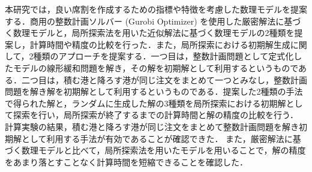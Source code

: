 本研究では，良い席割を作成するための指標や特徴を考慮した数理モデルを提案する．商用の整数計画ソルバー (Gurobi Optimizer) を使用した厳密解法に基づく数理モデルと，局所探索法を用いた近似解法に基づく数理モデルの2種類を提案し，計算時間や精度の比較を行った．また，局所探索における初期解生成に関して，2種類のアプローチを提案する．一つ目は，整数計画問題として定式化したモデルの線形緩和問題を解き，その解を初期解として利用するというものである．二つ目は，積む港と降ろす港が同じ注文をまとめて一つとみなし，整数計画問題を解き解を初期解として利用するというものである．提案した2種類の手法で得られた解と，ランダムに生成した解の3種類を局所探索における初期解として探索を行い，局所探索が終了するまでの計算時間と解の精度の比較を行う．
計算実験の結果，積む港と降ろす港が同じ注文をまとめて整数計画問題を解き初期解として利用する手法が有効であることが確認できた．
また，厳密解法に基づく数理モデルと比べて，局所探索法を用いたモデルを用いることで，解の精度をあまり落とすことなく計算時間を短縮できることを確認した．
